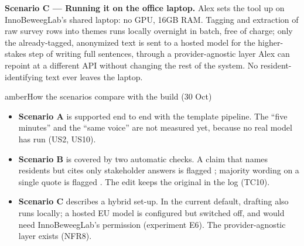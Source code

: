 \textbf{Scenario C --- Running it on the office laptop.} Alex sets the tool up on InnoBeweegLab's shared laptop: no GPU, 16GB RAM. Tagging and extraction of raw survey rows into themes runs locally overnight in batch, free of charge; only the already-tagged, anonymized text is sent to a hosted model for the higher-stakes step of writing full sentences, through a provider-agnostic layer Alex can repoint at a different API without changing the rest of the system. No resident-identifying text ever leaves the laptop.

\begin{calloutbox}{amber}{How the scenarios compare with the build (30 Oct)}
\begin{itemize}
\item \textbf{Scenario A} is supported end to end with the template pipeline. The ``five minutes'' and the ``same voice'' are not measured yet, because no real model has run (US2, US10).
\item \textbf{Scenario B} is covered by two automatic checks. A claim that names residents but cites only stakeholder answers is flagged ; majority wording on a single quote is flagged . The edit keeps the original in the log (TC10).
\item \textbf{Scenario C} describes a hybrid set-up. In the current default, drafting also runs locally; a hosted EU model is configured but switched off, and would need InnoBeweegLab's permission (experiment E6). The provider-agnostic layer exists (NFR8).
\end{itemize}
\end{calloutbox}
